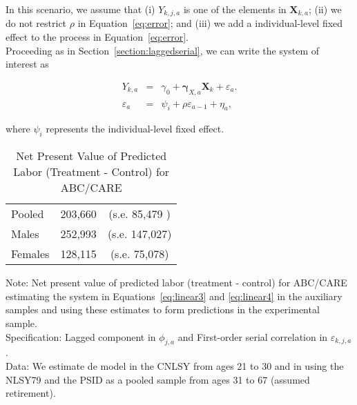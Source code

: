 \noindent In this scenario, we assume that (i) $Y_{k,j,a}$ is one of the elements in $\bm{X}_{k,a}$; (ii) we do not restrict $\rho$ in Equation~\eqref{eq:error}; and (iii) we add a individual-level fixed effect to the process in Equation~\eqref{eq:error}. \\

\noindent Proceeding as in Section~\ref{section:laggedserial}, we can write the system of interest as 

\begin{eqnarray}
Y_{k,a} &=&\gamma_{0} + \bm{\gamma}_{X,a} \bm{X}_{k} + \varepsilon_{a}. \label{eq:linear3} \\
\varepsilon_{a} &=& \psi_{i} + \rho \varepsilon_{a-1} + \eta_{a}, \label{eq:linear4}
\end{eqnarray}

\noindent where $\psi_{i}$ represents the individual-level fixed effect. 

\begin{table}[H] 
\begin{threeparttable}
\caption{Net Present Value of Predicted Labor (Treatment - Control) for ABC/CARE}
\label{table:yourlabel}
\centering 
\begin{tabular}{lcc} \toprule
Pooled & 203,660 & (s.e. 85,479 ) \\
Males & 252,993 & (s.e. 147,027) \\ 
Females & 128,115 & (s.e. 75,078) \\ \bottomrule
\end{tabular}
\end{threeparttable}
\end{table}
\begin{spacing}{1}
\begin{footnotesize}
\noindent Note: Net present value of predicted labor (treatment - control) for ABC/CARE estimating the system in Equations~\eqref{eq:linear3} and \eqref{eq:linear4} in the auxiliary samples and using these estimates to form predictions in the experimental sample.\\ 
\noindent Specification: Lagged component in $\phi_{j,a}$ and First-order serial correlation in $\varepsilon_{k,j,a}$.\\ 
\noindent Data: We estimate de model in the CNLSY from ages 21 to 30 and in using the NLSY79 and the PSID as a pooled sample from ages 31 to 67 (assumed retirement).\\ \\ 
\end{footnotesize}
\end{spacing}


